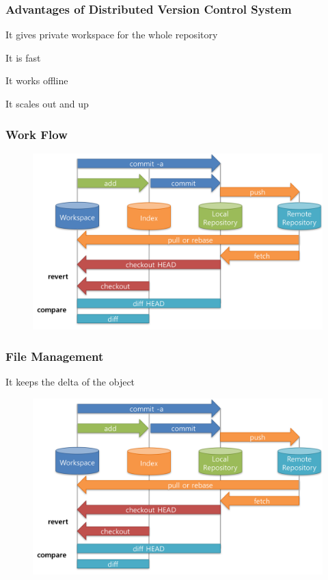 \documentclass[newPxFont,sthlmFooter,nooffset]{beamer}
\begin{document}
\begin{frame}[t]
  \frametitle{Advantages of Distributed Version Control System}
It gives private workspace for the whole repository

It is fast

It works offline

It scales out and up

\end{frame}



\begin{frame}[t]
  \frametitle{Work Flow }
\begin{figure}[h]
  \centering
  \includegraphics[width=\linewidth]{figures/fig4}
\end{figure}


\end{frame}

\begin{frame}[t]
  \frametitle{File Management }
It keeps the delta of the object

\begin{figure}[h]
  \centering
  \includegraphics[width=\linewidth]{figures/fig4}
\end{figure}

\end{frame}
\end{document}
